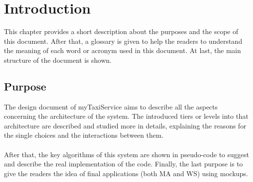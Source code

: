 \documentclass[\mainpath/main]{subfiles}
\begin{document}
\chapter{Introduction} %
\label{introduction}

\setmyfancystyle

This chapter provides a short description about the purposes and the scope of this document. After that, a glossary is given to help the readers to understand the meaning of each word or acronym used in this document. At last, the main structure of the document is shown.

\section{Purpose}
The design document of myTaxiService aims to describe all the aspects concerning the architecture of the system. The introduced tiers or levels into that architecture are described and studied more in details, explaining the reasons for the single choices and the interactions between them.\\
\\
After that, the key algorithms of this system are shown in pseudo-code to suggest and describe the real implementation of the code. Finally, the last purpose is to give the readers the idea of final applications (both MA and WS) using mockups.
\end{document}
